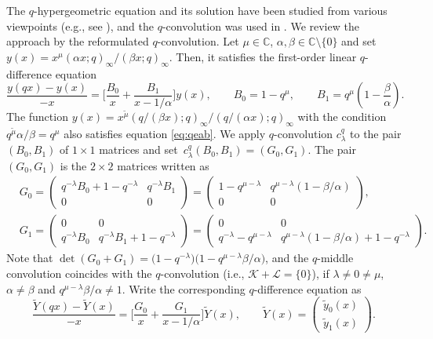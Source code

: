 \documentclass[pdftex]{sigma}
\numberwithin{equation}{section}
\theoremstyle{definition}
\begin{document}
The $q$-hypergeometric equation and its solution have been studied from various viewpoints (e.g., see \cite{GR}), and the $q$-convolution was used in \cite{AT}.
We review the approach by the reformulated $q$-convolution.
Let $\mu \in \mathbb{C}$, $\alpha, \beta \in \mathbb{C} \setminus \{0\}$ and set $y(x)=x^{\mu}(\alpha x;q)_{\infty}/(\beta x;q)_{\infty}$.
Then, it satisfies the first-order linear $q$-difference equation
\begin{equation} \label{eq:qeab}
\frac{y(qx) - y(x)}{-x} = \bigg[ \frac{B_0}{x} + \frac{B_1}{x-1/\alpha} \bigg] y(x) ,\qquad B_0= 1 - q^{\mu},\qquad B_1= q^{\mu} \left(1 - \frac{\beta}{\alpha} \right).
\end{equation}
The function $y(x)= x^{\tilde{\mu }} (q/( \beta x) ;q)_{\infty}/(q/(\alpha x) ;q)_{\infty} $ with the condition $q^{\tilde{\mu }} \alpha /\beta = q^{\mu} $ also satisfies equation \eqref{eq:qeab}.
We apply $q$-convolution $c^q_{\lambda}$ to the pair $(B_0, B_1)$ of $1 \times 1$ matrices and set~${c^q_{\lambda}(B_0, B_1) = (G_0, G_1)}$.
The pair $(G_0 , G_1)$ is the $2\times 2$ matrices written as
\begin{align*}
& G_0 = \begin{pmatrix}
 q^{-\lambda}B_0 + 1 -q^{-\lambda} & q^{-\lambda}B_1 \\
 0 & 0
 \end{pmatrix}
 = \begin{pmatrix}
 1 - q^{\mu - \lambda} & q^{\mu - \lambda}(1 - \beta/\alpha) \\
 0 & 0
	 \end{pmatrix}, \\
& G_1 = \begin{pmatrix}
 0 & 0 \\
 q^{-\lambda}B_0 & q^{-\lambda}B_1 + 1 -q^{-\lambda}
 \end{pmatrix}
 = \begin{pmatrix}
 0 & 0 \\
 q^{-\lambda} - q^{\mu - \lambda} & q^{\mu - \lambda}(1 - \beta/\alpha) + 1 -q^{-\lambda}
 \end{pmatrix}.
\end{align*}
Note that $\det ( G_0 +G_1 )= \bigl( 1 -q^{-\lambda}\bigr)\bigl(1- q^{\mu - \lambda} \beta/\alpha \bigr)$, and the $q$-middle convolution coincides with the $q$-convolution (i.e., $ \mathcal{K} + \mathcal{L} =\{ 0 \}$), if $\lambda \neq 0 \neq \mu $, $\alpha \neq \beta $ and $q^{\mu - \lambda} \beta/\alpha \neq 1$.
Write the corresponding $q$-difference equation as
\begin{equation} \label{eq:qhg-sta}
\frac{\widetilde{Y}(qx)-\widetilde{Y}(x)}{-x} = \Biggl[ \frac{G_0}{x} +\frac{G_1}{x-1/\alpha } \Biggr] \widetilde{Y}(x) ,
\qquad \widetilde{Y}(x)=\begin{pmatrix}
 \widetilde{y}_0(x)\\
 \widetilde{y}_1(x)
 \end{pmatrix}.
\end{equation}
\end{document}
